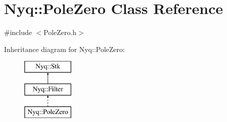 \hypertarget{class_nyq_1_1_pole_zero}{}\section{Nyq\+:\+:Pole\+Zero Class Reference}
\label{class_nyq_1_1_pole_zero}


{\ttfamily \#include $<$Pole\+Zero.\+h$>$}

Inheritance diagram for Nyq\+:\+:Pole\+Zero\+:\begin{figure}[H]
\begin{center}
\leavevmode
\includegraphics[height=3.000000cm]{class_nyq_1_1_pole_zero}
\end{center}
\end{figure}
